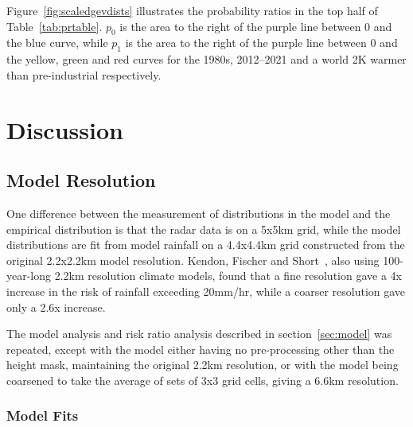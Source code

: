 Figure~\ref{fig:scaledgevdists} illustrates the probability ratios in the top half of Table~\ref{tab:prtable}.
$p_0$ is the area to the right of the purple line between 0 and the blue curve,
    while $p_1$ is the area to the right of the purple line between 0 and the yellow, green and red curves for
    the 1980s, 2012--2021 and a world 2K warmer than pre-industrial respectively.


\section{Discussion}\label{sec:discussion}

\begin{comment}
This section should give a picture of what you have taken out of your
project and how you can put it into context.

This section should summarise the results obtained, detail conclusions
reached, suggest future work, and changes that you would make if you
repeated the project.
\end{comment}

\subsection{Model Resolution}\label{subsec:dismodeldef}

One difference between the measurement of distributions in the model and the empirical distribution is that the radar data is on a 5x5km grid,
    while the model distributions are fit from model rainfall on a 4.4x4.4km grid constructed from the original 2.2x2.2km model resolution.
Kendon, Fischer and Short~\cite{Kendon_Fischer_Short_2023}, also using 100-year-long 2.2km resolution climate models,
    found that a fine resolution gave a 4x increase in the risk of rainfall exceeding 20mm/hr,
    while a coarser resolution gave only a 2.6x increase.

The model analysis and risk ratio analysis described in section~\ref{sec:model} was repeated,
    except with the model either having no pre-processing other than the height mask,
    maintaining the original 2.2km resolution,
    or with the model being coarsened to take the average of sets of 3x3 grid cells,
    giving a 6.6km resolution.

\subsubsection{Model Fits}

